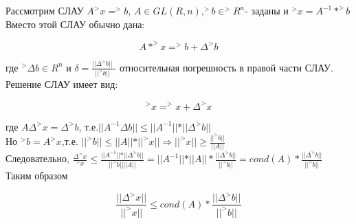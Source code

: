 \documentclass[__main__.tex]{subfiles}
\begin{document}
\begin{definition}
	Рассмотрим СЛАУ $A ^>x = ^>b$, $A\in GL(R,n), ^>b\in ^>R^n$- заданы и $^>x=A^{-1}* ^>b$\\
	Вместо этой СЛАУ обычно дана:
	
	$$A* ^>x= ^>b + \Delta^> b$$
	
	где $^>\Delta b \in R^n$ и $\delta=\frac{\vert\vert\Delta^> b\vert\vert}{\vert\vert ^>b\vert\vert}$- относительная погрешность в правой части СЛАУ.\\
	Решение СЛАУ имеет вид:
	
	$$^>x=^>x + \Delta^> x$$
	
	где $A \Delta^> x=  \Delta^> b$, т.е.$\vert\vert A^{-1} \Delta b \vert\vert \leq \vert\vert A^{-1}\vert\vert *\vert\vert \Delta^> b\vert\vert$\\
	Но $^>b=A ^>x$,т.е. $\vert\vert ^>b\vert\vert \leq \vert\vert A\vert\vert*\vert\vert^>x\vert\vert \Rightarrow \vert\vert ^>x\vert\vert \geq \frac{\vert\vert^>b\vert\vert}{\vert\vert A \vert\vert}$\\
	Следовательно, $\frac{\Delta^> x}{^>x}\leq \frac{\vert\vert A^{-1}\vert\vert * \vert\vert \Delta^> b \vert\vert}{\vert\vert ^>b \vert\vert \vert\vert A\vert\vert}=\vert\vert A^{-1}\vert\vert * \vert\vert A \vert\vert * \frac{\vert\vert \Delta^> b\vert\vert}{\vert\vert ^>b \vert\vert}= cond(A)*\frac{\vert\vert \Delta^> b\vert\vert}{\vert\vert ^>b \vert\vert}$\\
	Таким образом 
	
	$$\frac{\vert\vert  \Delta^> x \vert\vert}{\vert\vert ^>x\vert\vert}\leq cond(A)*\frac{\vert\vert \Delta^> b\vert\vert}{\vert\vert ^>b \vert\vert}$$
\end{definition}
\end{document}
